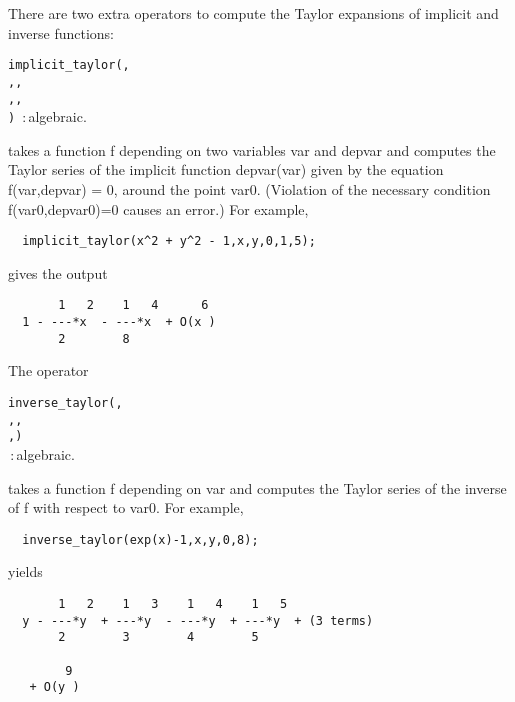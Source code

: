 \hypertarget{operator:IMPLICIT_TAYLOR}{}
There are two
extra operators to compute the Taylor expansions of implicit and
inverse functions:
\begin{syntax}
  \texttt{implicit\_taylor(}\texttt{,}\\
  \hspace*{1.4in}\texttt{,}\texttt{,}\\
  \hspace*{1.4in}\texttt{,}\texttt{,}\\
  \hspace*{1.4in}\texttt{)}
         \,:\,algebraic.
\end{syntax}
takes a function f depending on two variables var and depvar and
computes the Taylor series of the implicit function depvar(var)
given by the equation f(var,depvar) = 0, around the point var0.  
(Violation of the necessary condition f(var0,depvar0)=0 causes an error.)
For example,
\begin{verbatim}
  implicit_taylor(x^2 + y^2 - 1,x,y,0,1,5);
\end{verbatim}
gives the output
\begin{verbatim}
       1   2    1   4      6
  1 - ---*x  - ---*x  + O(x )
       2        8
\end{verbatim}

\hypertarget{operator:INVERSE_TAYLOR}{}
The operator
\begin{syntax}
  \texttt{inverse\_taylor(}\texttt{,}\\
  \hspace*{1.4in}\texttt{,}\texttt{,}\\
  \hspace*{1.4in}\texttt{,}\texttt{)}\\
         \,:\,algebraic.
\end{syntax}
takes a function f depending on var and computes the Taylor series of
the inverse of f with respect to var0. For example,
\begin{verbatim}
  inverse_taylor(exp(x)-1,x,y,0,8);
\end{verbatim}
yields
\begin{verbatim}
       1   2    1   3    1   4    1   5
  y - ---*y  + ---*y  - ---*y  + ---*y  + (3 terms)
       2        3        4        5

        9
   + O(y )
  \end{verbatim}


